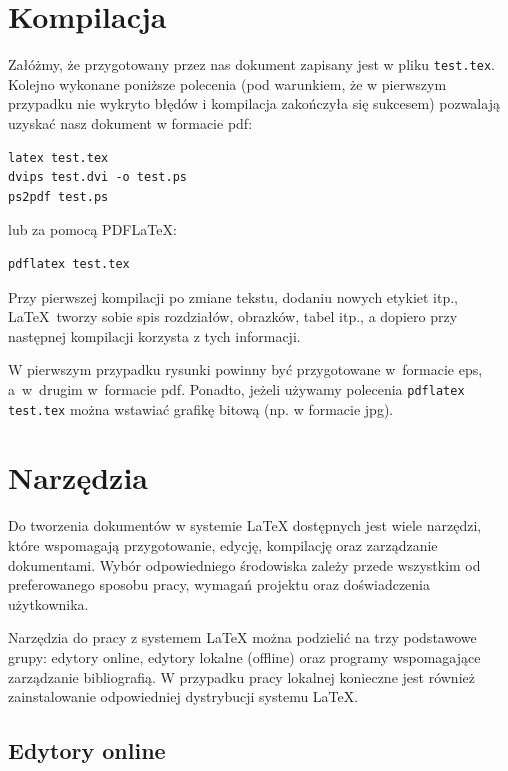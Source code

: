 \section{Kompilacja}
\label{sec:kompilacja}


Załóżmy, że przygotowany przez nas dokument zapisany jest w pliku \texttt{test.tex}. Kolejno wykonane poniższe polecenia (pod warunkiem, że w pierwszym przypadku nie wykryto błędów i kompilacja zakończyła się sukcesem) pozwalają uzyskać nasz dokument w formacie pdf:
\begin{lstlisting}
latex test.tex
dvips test.dvi -o test.ps
ps2pdf test.ps
\end{lstlisting}
%
lub za pomocą PDF\LaTeX:
\begin{lstlisting}
pdflatex test.tex
\end{lstlisting}

Przy pierwszej kompilacji po zmiane tekstu, dodaniu nowych etykiet itp., \LaTeX~tworzy sobie spis rozdziałów, obrazków, tabel itp., a dopiero przy następnej kompilacji korzysta z tych informacji.

W pierwszym przypadku rysunki powinny być przygotowane w~formacie eps, a~w~drugim w~formacie pdf. Ponadto, jeżeli używamy polecenia \texttt{pdflatex test.tex} można wstawiać grafikę bitową (np. w formacie jpg).



\section{Narzędzia}
\label{sec:narzedzia}

Do tworzenia dokumentów w systemie \LaTeX{} dostępnych jest wiele narzędzi, które wspomagają przygotowanie, edycję, kompilację oraz zarządzanie dokumentami. Wybór odpowiedniego środowiska zależy przede wszystkim od preferowanego sposobu pracy, wymagań projektu oraz doświadczenia użytkownika.

Narzędzia do pracy z systemem \LaTeX{} można podzielić na trzy podstawowe grupy: edytory online, edytory lokalne (offline) oraz programy wspomagające zarządzanie bibliografią. W przypadku pracy lokalnej konieczne jest również zainstalowanie odpowiedniej dystrybucji systemu \LaTeX{}.

\subsection{Edytory online}

